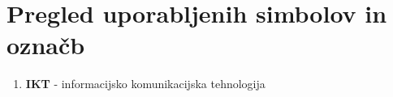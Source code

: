 
\section*{Pregled uporabljenih simbolov in označb}
\label{sec:pregled_uporabljenih_simbolov_in_označb}

\begin{enumerate}
\item \textbf{IKT} - informacijsko komunikacijska tehnologija
\end{enumerate}




